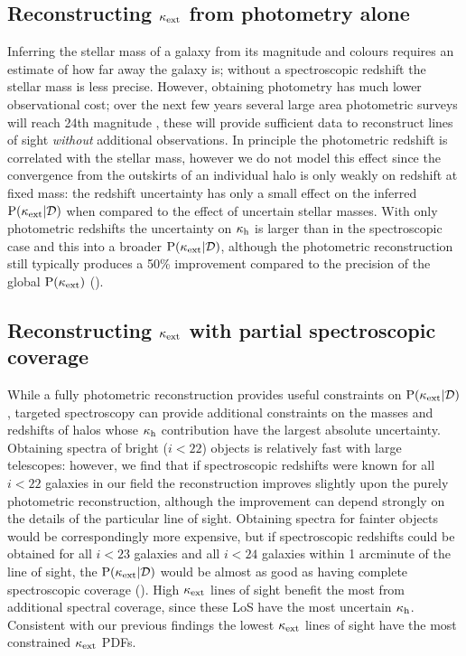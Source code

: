 \documentclass[useAMS,usenatbib]{mn2e}
\begin{document}
%

\subsection{Reconstructing $\kappa_{\rm ext}$ from photometry alone}

Inferring the stellar mass of a galaxy from its magnitude and colours requires
an estimate of how far away the galaxy is; without a spectroscopic redshift
the \infered stellar mass is less precise. However, obtaining photometry has
much lower observational cost; over the next few years several large area
photometric surveys will reach 24th magnitude \citep{Euclid,LSST}, these will
provide sufficient data to reconstruct lines of sight {\it without} additional
observations. In principle the photometric redshift is correlated with the
\infered stellar mass, however we do not model this effect since the
convergence from the outskirts of an individual halo is only weakly \dependant
on redshift at fixed mass: the redshift uncertainty has only a small effect on the
inferred ${\rm P}(\kappa_{\rm ext}|{\mathcal{D}})$ when compared to the effect of uncertain stellar
masses.  With only photometric redshifts the uncertainty on
$\kappa_{\rm h}$ is larger than in the spectroscopic case and this
\propogates into a broader ${\rm P}(\kappa_{\rm ext}|{\mathcal{D}})$, although the photometric
reconstruction still typically produces a 50\% improvement compared to the
precision of the global ${\rm P}(\kappa_{\rm ext})$ ().


\subsection{Reconstructing $\kappa_{\rm ext}$ with partial spectroscopic coverage}

While a fully photometric reconstruction provides useful constraints on
${\rm P}(\kappa_{\rm ext}|{\mathcal{D}})$, targeted spectroscopy can provide additional constraints
on the masses and redshifts of halos whose $\kappa_{\rm h}$ contribution have the
largest absolute uncertainty. Obtaining spectra of bright ($i<22$) objects is
relatively fast with large telescopes: however, we find that if spectroscopic
redshifts were known for all $i<22$ galaxies in our field the reconstruction
improves slightly upon the purely photometric reconstruction, although the
improvement can depend strongly on the details of the particular line of
sight. Obtaining spectra for fainter objects would be correspondingly more
expensive, but if spectroscopic redshifts could be obtained for all $i<23$
galaxies and all $i<24$ galaxies within 1 arcminute of the line of sight, the
${\rm P}(\kappa_{\rm ext}|{\mathcal{D}})$ would be almost as good as having complete spectroscopic
coverage (). High $\kappa_{\rm ext}$ lines of sight benefit the
most from additional spectral coverage, since these LoS have the most
uncertain $\kappa_{\rm h}$. Consistent with our previous findings the lowest $\kappa_{\rm ext}$
lines of sight have the most constrained $\kappa_{\rm ext}$ PDFs.
\end{document}

